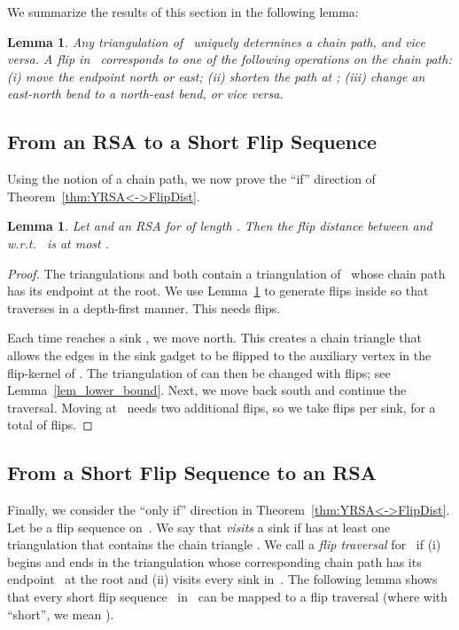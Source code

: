 \documentclass[a4paper,11pt]{article}
\newtheorem{lemma}[theorem]{Lemma}
\newcommand{\noproof}{~\hfill}
\newcommand{\qedopt}{}
\newcommand{\ShoLong}[2]{#2}
\begin{document}
\ShoLong{The next lemma describes how the chain path is affected by flips;
see Fig.~\ref{fig_chain_path}.
}
{We summarize the results of this section in the following lemma:
}
\begin{lemma}\label{lem:structure}
Any triangulation  of~ uniquely determines a chain path, and vice versa.
A flip in~ corresponds to one of the following operations on the chain path:
(i) move the endpoint  north or east;
(ii) shorten the path at ;
(iii) change an east-north bend to a north-east bend, or vice versa.\noproof
\end{lemma}

\subsection{From an RSA to a Short Flip Sequence}
Using the notion of a chain path, we now prove the
``if'' direction of Theorem~\ref{thm:YRSA<->FlipDist}.

\begin{lemma}\label{lem:YRTSP->flip_tour}
Let  and  an RSA for  of length .
Then the flip distance between  and  w.r.t.~ is at 
most .
\end{lemma}
\begin{proof}
The triangulations  and  both contain a triangulation of~ 
whose chain path has its endpoint   at the root.
We use Lemma~\ref{lem:structure} to generate flips inside  so
that  traverses  in a depth-first manner.
This needs  flips.

Each time  reaches a sink , we move  north.
This creates a chain triangle that allows the edges in
the sink gadget  to be flipped to the auxiliary vertex
in the flip-kernel of . The triangulation of  can then be changed
with  flips; see Lemma~\ref{lem_lower_bound}.
Next, we move  back south and continue the traversal.
Moving  at~ needs two additional flips, so we take  flips per sink,
for a total of  flips.
\qedopt
\end{proof}


\subsection{From a Short Flip Sequence to an RSA}
Finally, we consider the ``only if'' direction in Theorem~\ref{thm:YRSA<->FlipDist}.
Let  be a flip sequence on~.
We say that  \emph{visits} a sink  if  has at least one triangulation that contains the chain 
triangle .
We call  a \emph{flip traversal} for~ if (i)  begins and ends in the triangulation whose corresponding chain path has its endpoint~ at the root and (ii)  visits every sink in~.
The following lemma shows that every short flip sequence~ in~ can be mapped to a flip traversal (where with ``short'', we mean ).
\end{document}
